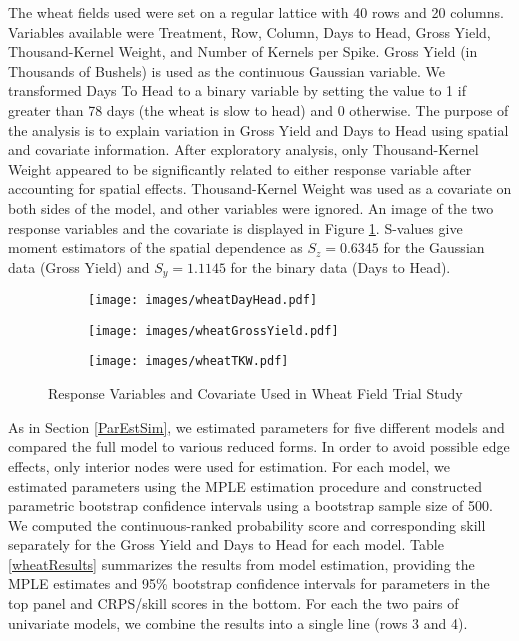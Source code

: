 \documentclass[12pt, a4paper, twoside]{article}
\begin{document}
The wheat fields used were set on a regular lattice with 40 rows and 20 columns. Variables available were Treatment, Row, Column, Days to Head, Gross Yield, Thousand-Kernel Weight, and Number of Kernels per Spike. Gross Yield (in Thousands of Bushels) is used as the continuous Gaussian variable. We transformed Days To Head to a binary variable by setting the value to 1 if greater than 78 days (the wheat is slow to head) and 0 otherwise. The purpose of the analysis is to explain variation in Gross Yield and Days to Head using spatial and covariate information. After exploratory analysis, only Thousand-Kernel Weight appeared to be significantly related to either response variable after accounting for spatial effects. Thousand-Kernel Weight was used as a covariate on both sides of the model, and other variables were ignored. An image of the two response variables and the covariate is displayed in Figure \ref{wheatimage}. S-values give moment estimators of the spatial dependence as $S_z = 0.6345$ for the Gaussian data (Gross Yield) and $S_y = 1.1145$ for the binary data (Days to Head).
\begin{figure}[!t]
	\centering
	\begin{subfigure}{0.4\textwidth}
		\texttt{[image: images/wheatDayHead.pdf]}%
	\end{subfigure}
	\begin{subfigure}{0.4\textwidth}
		\texttt{[image: images/wheatGrossYield.pdf]}%
	\end{subfigure}
	\begin{subfigure}{0.4\textwidth}
		\texttt{[image: images/wheatTKW.pdf]}%
	\end{subfigure}
	\caption{Response Variables and Covariate Used in Wheat Field Trial Study}
	\label{wheatimage}
\end{figure}

As in Section \ref{ParEstSim}, we estimated parameters for five different models and compared the full model to various reduced forms. In order to avoid possible edge effects, only interior nodes were used for estimation. For each model, we estimated parameters using the MPLE estimation procedure and constructed parametric bootstrap confidence intervals using a bootstrap sample size of 500. We computed the continuous-ranked probability score and corresponding skill separately for the Gross Yield and Days to Head for each model. Table \ref{wheatResults} summarizes the results from model estimation, providing the MPLE estimates and 95\% bootstrap confidence intervals for parameters in the top panel and CRPS/skill scores in the bottom. For each the two pairs of univariate models, we combine the results into a single line (rows 3 and 4).
\end{document}
